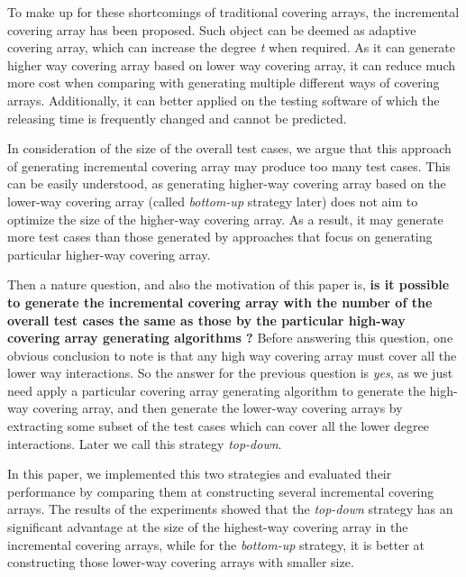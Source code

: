 \documentclass[conference]{IEEEtran}
\theoremstyle{definition}
\begin{document}

To make up for these shortcomings of traditional covering arrays, the incremental covering array \cite{fouche2009incremental} has been proposed. Such object can be deemed as adaptive covering array, which can increase the degree \emph{t} when required. As it can generate higher way covering array based on lower way covering array, it can reduce much more cost when comparing with generating multiple different ways of covering arrays. Additionally, it can better applied on the testing software of which the releasing time is  frequently changed and cannot be predicted.


In consideration of the size of the overall test cases, we argue that this approach of generating incremental covering array may produce too many test cases. This can be easily understood, as generating higher-way covering array based on the lower-way covering array (called \emph{bottom-up} strategy later) does not aim to optimize the size of the higher-way covering array. As a result, it may generate more test cases than those generated by approaches that focus on generating particular higher-way covering array.

Then a nature question, and also the motivation of this paper is, \textbf{is it possible to generate the incremental covering array with the number of the overall test cases the same as those by the particular high-way covering array generating algorithms ?}  Before answering this question, one obvious conclusion to note is that any high way covering array must cover all the lower way interactions. So the answer for the previous question is \emph{yes}, as we just need apply a particular covering array generating algorithm to generate the high-way covering array, and then generate the lower-way covering arrays by extracting some subset of the test cases which can cover all the lower degree interactions. Later we call this strategy \emph{top-down}.

In this paper, we implemented this two strategies and evaluated their performance by comparing them at constructing several incremental covering arrays. The results of the experiments showed that the \emph{top-down} strategy has an significant advantage at the size of the highest-way covering array in the incremental covering arrays, while for the \emph{bottom-up} strategy, it is better at constructing those lower-way covering arrays with smaller size.
\end{document}
